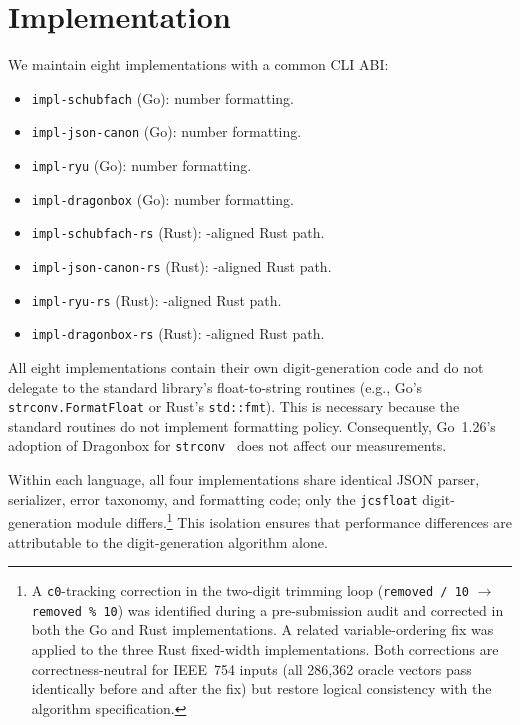 \section{Implementation}
\label{sec:implementation}

We maintain eight implementations with a common CLI ABI:
\begin{itemize}
\item \texttt{impl-schubfach} (Go): \schubfach number formatting.
\item \texttt{impl-json-canon} (Go): \burgerdybvig number formatting.
\item \texttt{impl-ryu} (Go): \ryualg number formatting.
\item \texttt{impl-dragonbox} (Go): \dragonbox number formatting.
\item \texttt{impl-schubfach-rs} (Rust): \schubfach-aligned Rust path.
\item \texttt{impl-json-canon-rs} (Rust): \burgerdybvig-aligned Rust path.
\item \texttt{impl-ryu-rs} (Rust): \ryualg-aligned Rust path.
\item \texttt{impl-dragonbox-rs} (Rust): \dragonbox-aligned Rust path.
\end{itemize}

All eight implementations contain their own digit-generation code and do
not delegate to the standard library's float-to-string routines (e.g.,
Go's \texttt{strconv.FormatFloat} or Rust's \texttt{std::fmt}).  This is
necessary because the standard routines do not implement \ecma formatting
policy.  Consequently, Go~1.26's adoption of Dragonbox for
\texttt{strconv}~\cite{godragonboxcl} does not affect our measurements.

Within each language, all four implementations share identical JSON
parser, serializer, error taxonomy, and \ecma formatting code; only the
\texttt{jcsfloat} digit-generation module differs.\footnote{A
\texttt{c0}-tracking correction in the \dragonbox two-digit trimming
loop (\texttt{removed~/~10} $\to$ \texttt{removed~\%~10}) was
identified during a pre-submission audit and corrected in both the Go
and Rust implementations.  A related variable-ordering fix was applied
to the three Rust fixed-width implementations.  Both corrections are
correctness-neutral for IEEE~754 inputs (all 286{,}362 oracle vectors
pass identically before and after the fix) but restore logical
consistency with the algorithm specification.}  This isolation
ensures that performance differences are attributable to the
digit-generation algorithm alone.

